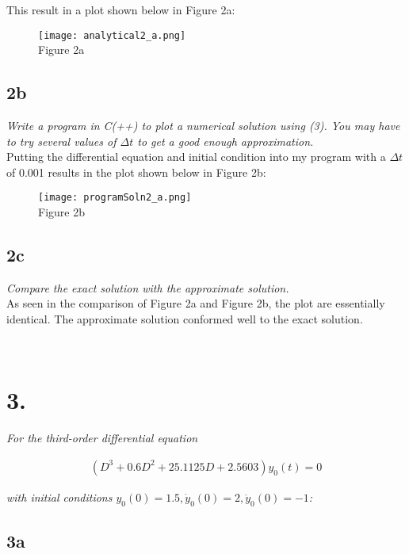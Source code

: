 \documentclass[10pt, AMS Euler]{article}
\begin{document}
This result in a plot shown below in Figure 2a: 

\begin{figure}[H]
    \centering
    \texttt{[image: analytical2\_a.png]}\\
    Figure 2a
\end{figure}

\subsection*{2b}
\textit{Write a program in C(++) to plot a numerical solution using (3). You may have to try several
values of $\Delta t$ to get a good enough approximation.}\\

Putting the differential equation and initial condition into my program with a $\Delta t$ of 0.001 results in the plot shown below in Figure 2b:

\begin{figure}[H]
    \centering
    \texttt{[image: programSoln2\_a.png]}\\
    Figure 2b
\end{figure}

\subsection*{2c}
\textit{Compare the exact solution with the approximate solution.}\\

As seen in the comparison of Figure 2a and Figure 2b, the plot are essentially identical. The approximate solution conformed well to the exact solution.

\noindent \underline{\hspace{7in}}\\
\section*{3.}
\textit{For the third-order differential equation}
\begin{center}
    \begin{align*}
        (D^3 + 0.6D^2 + 25.1125D + 2.5603)y_0(t) = 0
    \end{align*}
\end{center}

\textit{with initial conditions $y_0(0) = 1.5, \dot{y}_0(0) = 2, \ddot{y}_0(0) = -1$:}

\subsection*{3a}
\end{document}
